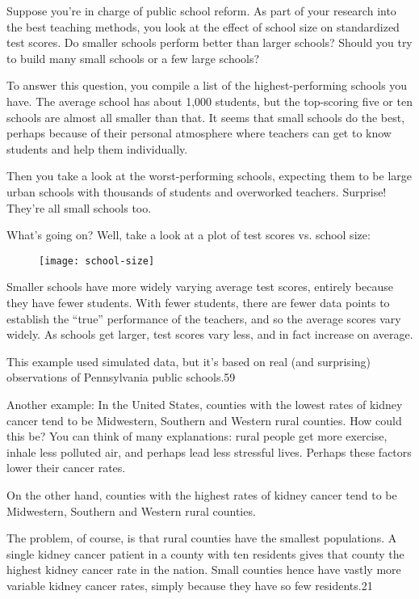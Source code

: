 Suppose you’re in charge of public school reform. As part of your research into the best teaching methods, you look at the effect of school size on standardized test scores. Do smaller schools perform better than larger schools? Should you try to build many small schools or a few large schools?

To answer this question, you compile a list of the highest-performing schools you have. The average school has about 1,000 students, but the top-scoring five or ten schools are almost all smaller than that. It seems that small schools do the best, perhaps because of their personal atmosphere where teachers can get to know students and help them individually.

Then you take a look at the worst-performing schools, expecting them to be large urban schools with thousands of students and overworked teachers. Surprise! They’re all small schools too.

What’s going on? Well, take a look at a plot of test scores vs. school size:


\newpage %

\begin{figure}[h!]
    \centering
    \texttt{[image: school-size]}
    \label{fig9:school-size}
\end{figure}

Smaller schools have more widely varying average test scores, entirely because they have fewer students. With fewer students, there are fewer data points to establish the “true” performance of the teachers, and so the average scores vary widely. As schools get larger, test scores vary less, and in fact increase on average.

This example used simulated data, but it’s based on real (and surprising) observations of Pennsylvania public schools.59

Another example: In the United States, counties with the lowest rates of kidney cancer tend to be Midwestern, Southern and Western rural counties. How could this be? You can think of many explanations: rural people get more exercise, inhale less polluted air, and perhaps lead less stressful lives. Perhaps these factors lower their cancer rates.

On the other hand, counties with the highest rates of kidney cancer tend to be Midwestern, Southern and Western rural counties.

The problem, of course, is that rural counties have the smallest populations. A single kidney cancer patient in a county with ten residents gives that county the highest kidney cancer rate in the nation. Small counties hence have vastly more variable kidney cancer rates, simply because they have so few residents.21


